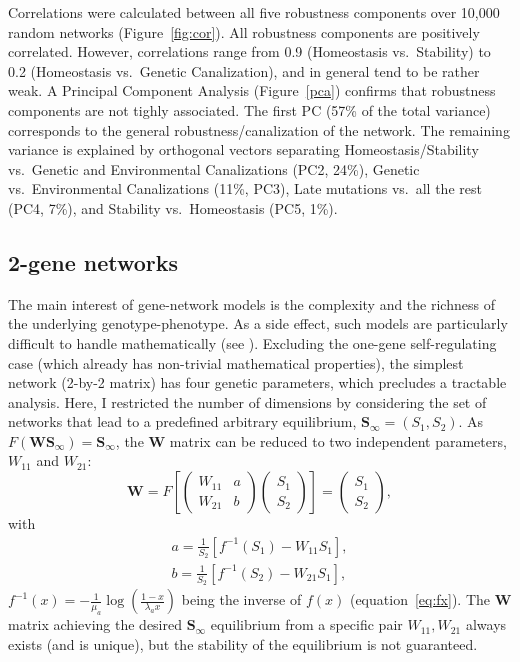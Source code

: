 \documentclass{article}
\begin{document}
Correlations were calculated between all five robustness components over 10,000 random networks (Figure~\ref{fig:cor}). All robustness components are positively correlated. However, correlations range from 0.9 (Homeostasis vs.\ Stability) to 0.2 (Homeostasis vs.\ Genetic Canalization), and in general tend to be rather weak. A Principal Component Analysis (Figure~\ref{pca}) confirms that robustness components are not tighly associated. The first PC (57\% of the total variance) corresponds to the general robustness/canalization of the network. The remaining variance is explained by orthogonal vectors separating Homeostasis/Stability vs.\ Genetic and Environmental Canalizations (PC2, 24\%), Genetic vs.\ Environmental Canalizations (11\%, PC3), Late mutations vs.\ all the rest (PC4, 7\%), and Stability vs.\ Homeostasis (PC5, 1\%). 

\subsection{2-gene networks}

The main interest of gene-network models is the complexity and the richness of the underlying genotype-phenotype. As a side effect, such models are particularly difficult to handle mathematically (see \cite{CTH11,LP12}). Excluding the one-gene self-regulating case (which already has non-trivial mathematical properties), the simplest network (2-by-2 matrix) has four genetic parameters, which precludes a tractable analysis. Here, I restricted the number of dimensions by considering the set of networks that lead to a predefined arbitrary equilibrium, $\bm S_\infty = (S_1, S_2)$. As $F(\bm W \bm S_\infty) = \bm S_\infty$, the $\bm W$ matrix can be reduced to two independent parameters, $W_{11}$ and $W_{21}$:
\begin{equation}
    \bm W = F \left [\begin{pmatrix} W_{11} & a \\ W_{21} & b \end{pmatrix}  \begin{pmatrix} S_1 \\ S_2 \end{pmatrix} \right] = \begin{pmatrix}S_1 \\ S_2 \end{pmatrix},
\end{equation}
\noindent with
\begin{equation}
    \begin{split}
        a = \frac{1}{S_2} [f^{-1}(S_1)-W_{11}S_1], \\
        b = \frac{1}{S_2} [f^{-1}(S_2) - W_{21} S_1],
    \end{split}
\end{equation}
\noindent $f^{-1}(x) = -\frac{1}{\mu_a} \log \left( \frac{1-x}{\lambda_a x} \right)$ being the inverse of $f(x)$ (equation~\ref{eq:fx}). The $\bm W$ matrix achieving the desired $\bm S_\infty$ equilibrium from a specific pair $W_{11}, W_{21}$ always exists (and is unique), but the stability of the equilibrium is not guaranteed. 
\end{document}
